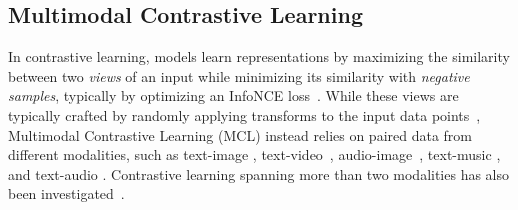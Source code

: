 \documentclass{article}
\begin{document}

\subsection{Multimodal Contrastive Learning}

In contrastive learning, models learn representations by maximizing the similarity between two \emph{views} of an input while minimizing its similarity with \emph{negative samples}, typically by optimizing an InfoNCE loss~\cite{chen2020simple}.
While these views are typically crafted by randomly applying transforms to the input data points~\cite{chen2020simple,spijkervet2021contrastive}, Multimodal Contrastive Learning (MCL) instead relies on paired data from different modalities, such as text-image \cite{clip}, text-video~\cite{VATT}, audio-image~\cite{L3}, text-music \cite{manco2022contrastive,mulan}, and text-audio \cite{elizalde2023clap, zhu2024cacophony}.
Contrastive learning spanning more than two modalities has also been investigated~\cite{guzhov2022audioclip,girdhar2023imagebind,GRAM}.
\end{document}
